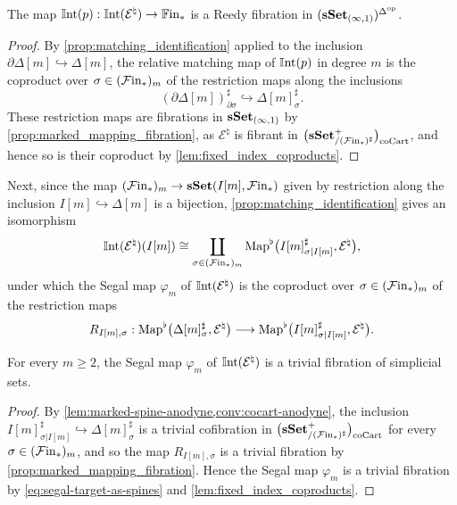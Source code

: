 \documentclass[10pt,reqno]{amsart}
\begin{document}
\begin{lemma}
\label{lem:strings_reedy_fibration}
The map $\mathbb{I}\mathrm{nt}(p):\mathbb{I}\mathrm{nt}(\mathcal E^\natural)\to\mathbb{F}\mathrm{in}_*$ is a
Reedy fibration in $(\mathbf{sSet}_{(\infty,1)})^{\Delta^{\mathrm{op}}}$.
\end{lemma}

\begin{proof}
By \cref{prop:matching_identification} applied to the inclusion
$\partial\Delta[m]\hookrightarrow\Delta[m]$, the relative matching
map of $\mathbb{I}\mathrm{nt}(p)$ in degree $m$ is the coproduct over
$\sigma\in(\mathcal{F}\mathrm{in}_*)_m$ of the restriction maps along the inclusions
\[
 (\partial\Delta[m])^\sharp_{\partial\sigma}
   \hookrightarrow\Delta[m]^\sharp_\sigma.
\]
These restriction maps are fibrations in $\mathbf{sSet}_{(\infty,1)}$ by
\cref{prop:marked_mapping_fibration}, as $\mathcal E^\natural$ is
fibrant in $\bigl(\mathbf{sSet}^+_{/(\mathcal{F}\mathrm{in}_*)^\sharp}\bigr)_{\mathrm{coCart}}$, and hence so is their coproduct by
\cref{lem:fixed_index_coproducts}.
\end{proof}


Next, since the map $(\mathcal{F}\mathrm{in}_*)_m\to\mathbf{sSet}(I[m],\mathcal{F}\mathrm{in}_*)$ given by
restriction along the inclusion $I[m]\hookrightarrow\Delta[m]$ is a
bijection, \cref{prop:matching_identification} gives an isomorphism
\begin{equation}
\label{eq:segal-target-as-spines}
\mathbb{I}\mathrm{nt}(\mathcal E^\natural)(I[m])
\cong\coprod_{\sigma\in (\mathcal{F}\mathrm{in}_*)_m}
\operatorname{Map}^\flat
\bigl(I[m]^\sharp_{\sigma|I[m]},\mathcal E^\natural\bigr),
\end{equation}
under which the Segal map $\varphi_m$ of
$\mathbb{I}\mathrm{nt}(\mathcal E^\natural)$ is the coproduct over
$\sigma\in (\mathcal{F}\mathrm{in}_*)_m$ of the restriction maps
\[
R_{I[m],\sigma}:
\operatorname{Map}^\flat
\bigl(\Delta[m]^\sharp_\sigma,\mathcal E^\natural\bigr)
\longrightarrow
\operatorname{Map}^\flat
\bigl(I[m]^\sharp_{\sigma|I[m]},\mathcal E^\natural\bigr).
\]

\begin{proposition}
\label{prop:marked-direct}
For every $m\geq2$, the Segal map $\varphi_m$ of
$\mathbb{I}\mathrm{nt}(\mathcal E^\natural)$ is a trivial fibration of simplicial
sets.
\end{proposition}

\begin{proof}
By \cref{lem:marked-spine-anodyne,conv:cocart-anodyne}, the inclusion
$I[m]^\sharp_{\sigma|I[m]}\hookrightarrow\Delta[m]^\sharp_\sigma$ is
a trivial cofibration in $\bigl(\mathbf{sSet}^+_{/(\mathcal{F}\mathrm{in}_*)^\sharp}\bigr)_{\mathrm{coCart}}$ for every
$\sigma\in(\mathcal{F}\mathrm{in}_*)_m$, and so the map $R_{I[m],\sigma}$ is a
trivial fibration by \cref{prop:marked_mapping_fibration}. Hence the
Segal map $\varphi_m$ is a trivial fibration by
\eqref{eq:segal-target-as-spines} and
\cref{lem:fixed_index_coproducts}.
\end{proof}
\end{document}
